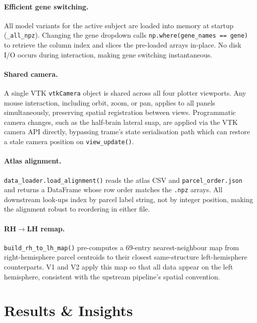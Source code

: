 \documentclass[11pt,letterpaper]{article}
\begin{document}
\paragraph{Efficient gene switching.}
All model variants for the active subject are loaded into memory at
startup (\texttt{\_all\_npz}).
Changing the gene dropdown calls \texttt{np.where(gene\_names == gene)}
to retrieve the column index and slices the pre-loaded arrays in-place.
No disk I/O occurs during interaction, making gene switching instantaneous.

\paragraph{Shared camera.}
A single VTK \texttt{vtkCamera} object is shared across all four
plotter viewports.
Any mouse interaction, including orbit, zoom, or pan, applies to all panels
simultaneously, preserving spatial registration between views.
Programmatic camera changes, such as the half-brain lateral snap, are
applied via the VTK camera API directly, bypassing trame's state
serialisation path which can restore a stale camera position on
\texttt{view\_update()}.

\paragraph{Atlas alignment.}
\texttt{data\_loader.load\_alignment()} reads the atlas CSV and
\texttt{parcel\_order.json} and returns a DataFrame whose row order
matches the \texttt{.npz} arrays.
All downstream look-ups index by parcel label string, not by integer
position, making the alignment robust to reordering in either file.

\paragraph{RH$\to$LH remap.}
\texttt{build\_rh\_to\_lh\_map()} pre-computes a 69-entry
nearest-neighbour map from right-hemisphere parcel centroids to
their closest same-structure left-hemisphere counterparts.
V1 and V2 apply this map so that all data appear on the left
hemisphere, consistent with the upstream pipeline's spatial convention.

\section{Results \& Insights}
\label{sec:results}
\end{document}
